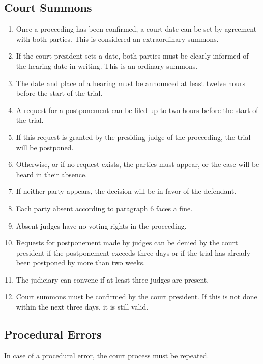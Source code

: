 \documentclass{article}
\begin{document}
\subsection{Court Summons}
\begin{enumerate}[(1)]
    \item Once a proceeding has been confirmed, a court date can be set by agreement with both parties. This is considered an extraordinary summons.
    \item If the court president sets a date, both parties must be clearly informed of the hearing date in writing. This is an ordinary summons.
    \item The date and place of a hearing must be announced at least twelve hours before the start of the trial.
    \item A request for a postponement can be filed up to two hours before the start of the trial.
    \item If this request is granted by the presiding judge of the proceeding, the trial will be postponed.
    \item Otherwise, or if no request exists, the parties must appear, or the case will be heard in their absence.
    \item If neither party appears, the decision will be in favor of the defendant.
    \item Each party absent according to paragraph 6 faces a fine.
    \item Absent judges have no voting rights in the proceeding.
    \item Requests for postponement made by judges can be denied by the court president if the postponement exceeds three days or if the trial has already been postponed by more than two weeks.
    \item The judiciary can convene if at least three judges are present.
    \item Court summons must be confirmed by the court president. If this is not done within the next three days, it is still valid.
\end{enumerate}

\subsection{Procedural Errors}
In case of a procedural error, the court process must be repeated.
\end{document}
